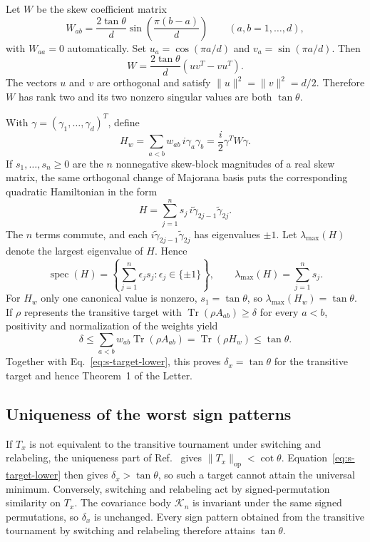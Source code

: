 \documentclass[10pt,aps,pra,twocolumn,superscriptaddress,nofootinbib,longbibliography]{revtex4-2}
\newcommand{\Tr}{\operatorname{Tr}}
\newcommand{\op}{\mathrm{op}}
\newcommand{\calK}{\mathcal{K}}
\begin{document}
{Let $W$ be the skew coefficient matrix
\begin{equation}
    W_{ab}=\frac{2\tan\theta}{d}\sin\!\left(\frac{\pi(b-a)}{d}\right)
    \qquad(a,b=1,\ldots,d),
    \label{eq:s-P}
\end{equation}
with $W_{aa}=0$ automatically.  Set $u_a=\cos(\pi a/d)$ and $v_a=\sin(\pi a/d)$.  Then
\begin{equation}
    W=\frac{2\tan\theta}{d}(uv^T-vu^T).
    \label{eq:s-ranktwo}
\end{equation}
The vectors $u$ and $v$ are orthogonal and satisfy $\|u\|^2=\|v\|^2=d/2$.  Therefore $W$ has rank two and its two nonzero singular values are both $\tan\theta$.

With $\gamma=(\gamma_1,\ldots,\gamma_d)^T$, define
\begin{equation}
    H_w=\sum_{a<b}w_{ab}\,i\gamma_a\gamma_b
    =\frac{i}{2}\gamma^TW\gamma.
    \label{eq:s-Hw}
\end{equation}
If $s_1,\ldots,s_n\ge0$ are the $n$ nonnegative skew-block magnitudes of a real skew matrix, the same orthogonal change of Majorana basis puts the corresponding quadratic Hamiltonian in the form
\begin{equation}
    H=\sum_{j=1}^{n}s_j\,i\tilde\gamma_{2j-1}\tilde\gamma_{2j}.
\end{equation}
The $n$ terms commute, and each $i\tilde\gamma_{2j-1}\tilde\gamma_{2j}$ has eigenvalues $\pm1$.  Let $\lambda_{\max}(H)$ denote the largest eigenvalue of $H$.  Hence
\begin{equation}
    \operatorname{spec}(H)=\left\{\sum_{j=1}^{n}\epsilon_j s_j:\epsilon_j\in\{\pm1\}\right\},
    \qquad \lambda_{\max}(H)=\sum_{j=1}^{n}s_j.
    \label{eq:s-quadratic-spectrum}
\end{equation}
For $H_w$ only one canonical value is nonzero, $s_1=\tan\theta$, so $\lambda_{\max}(H_w)=\tan\theta$.  If $\rho$ represents the transitive target with $\Tr(\rho A_{ab})\ge\delta$ for every $a<b$, positivity and normalization of the weights yield
\begin{equation}
    \delta\le\sum_{a<b}w_{ab}\Tr(\rho A_{ab})
    =\Tr(\rho H_w)\le\tan\theta.
\end{equation}
Together with Eq.~\eqref{eq:s-target-lower}, this proves $\delta_x=\tan\theta$ for the transitive target and hence Theorem~1 of the Letter.

\subsection{Uniqueness of the worst sign patterns}
If $T_x$ is not equivalent to the transitive tournament under switching and relabeling, the uniqueness part of Ref.~\cite{Deng2018Tournament} gives $\|T_x\|_{\op}<\cot\theta$.  Equation~\eqref{eq:s-target-lower} then gives $\delta_x>\tan\theta$, so such a target cannot attain the universal minimum.  Conversely, switching and relabeling act by signed-permutation similarity on $T_x$.  The covariance body $\calK_n$ is invariant under the same signed permutations, so $\delta_x$ is unchanged.  Every sign pattern obtained from the transitive tournament by switching and relabeling therefore attains $\tan\theta$.

}
\end{document}
